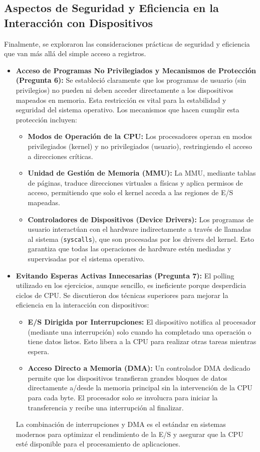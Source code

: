 \documentclass[12pt, a4paper]{article}
\begin{document}
\subsection*{Aspectos de Seguridad y Eficiencia en la Interacción con Dispositivos}
Finalmente, se exploraron las consideraciones prácticas de seguridad y eficiencia que van más allá del simple acceso a registros.
\begin{itemize}
    \item \textbf{Acceso de Programas No Privilegiados y Mecanismos de Protección (Pregunta 6):} Se estableció claramente que los programas de usuario (sin privilegios) no pueden ni deben acceder directamente a los dispositivos mapeados en memoria. Esta restricción es vital para la estabilidad y seguridad del sistema operativo. Los mecanismos que hacen cumplir esta protección incluyen:
    \begin{itemize}
        \item \textbf{Modos de Operación de la CPU:} Los procesadores operan en modos privilegiados (kernel) y no privilegiados (usuario), restringiendo el acceso a direcciones críticas.
        \item \textbf{Unidad de Gestión de Memoria (MMU):} La MMU, mediante tablas de páginas, traduce direcciones virtuales a físicas y aplica permisos de acceso, permitiendo que solo el kernel acceda a las regiones de E/S mapeadas.
        \item \textbf{Controladores de Dispositivos (Device Drivers):} Los programas de usuario interactúan con el hardware indirectamente a través de llamadas al sistema (\texttt{syscalls}), que son procesadas por los drivers del kernel. Esto garantiza que todas las operaciones de hardware estén mediadas y supervisadas por el sistema operativo.
    \end{itemize}
    \item \textbf{Evitando Esperas Activas Innecesarias (Pregunta 7):} El polling utilizado en los ejercicios, aunque sencillo, es ineficiente porque desperdicia ciclos de CPU. Se discutieron dos técnicas superiores para mejorar la eficiencia en la interacción con dispositivos:
    \begin{itemize}
        \item \textbf{E/S Dirigida por Interrupciones:} El dispositivo notifica al procesador (mediante una interrupción) solo cuando ha completado una operación o tiene datos listos. Esto libera a la CPU para realizar otras tareas mientras espera.
        \item \textbf{Acceso Directo a Memoria (DMA):} Un controlador DMA dedicado permite que los dispositivos transfieran grandes bloques de datos directamente a/desde la memoria principal sin la intervención de la CPU para cada byte. El procesador solo se involucra para iniciar la transferencia y recibe una interrupción al finalizar.
    \end{itemize}
    La combinación de interrupciones y DMA es el estándar en sistemas modernos para optimizar el rendimiento de la E/S y asegurar que la CPU esté disponible para el procesamiento de aplicaciones.
\end{itemize}
\end{document}
